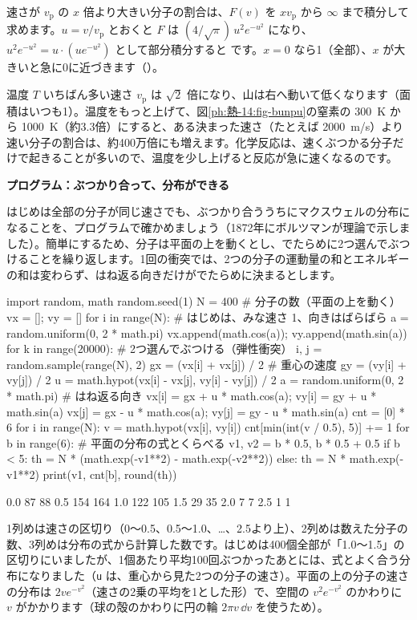 速さが $v_{\mathrm p}$ の $x$ 倍より大きい分子の割合は、$F(v)$ を $xv_{\mathrm p}$ から $\infty$ まで積分して求めます。$u=v/v_{\mathrm p}$ とおくと $F$ は $(4/\sqrt\pi)\,u^2e^{-u^2}$ になり、$u^2e^{-u^2}=u\cdot(ue^{-u^2})$ として部分積分すると
\label{ph:熱-14:erf}です。$x=0$ なら1（全部）、$x$ が大きいと急に0に近づきます（\nobreak{}\nobreak）。

\begin{phbaisuru}{温度 $T$}
いちばん多い速さ $v_{\mathrm p}$ は $\sqrt2$ 倍になり、山は右へ動いて低くなります（面積はいつも1）。温度をもっと上げて、図\ref{ph:熱-14:fig-bunpu}の窒素の \qty{300}{K} から \qty{1000}{K}（約3.3倍）にすると、ある決まった速さ（たとえば \qty{2000}{m/s}）より速い分子の割合は、約400万倍にも増えます。化学反応は、速くぶつかる分子だけで起きることが多いので、温度を少し上げると反応が急に速くなるのです。
\end{phbaisuru}

\noindent\textbf{プログラム：ぶつかり合って、分布ができる}\par\nobreak
はじめは全部の分子が同じ速さでも、ぶつかり合ううちにマクスウェルの分布になることを、プログラムで確かめましょう（1872年にボルツマンが理論で示しました）。簡単にするため、分子は平面の上を動くとし、でたらめに2つ選んでぶつけることを繰り返します。1回の衝突では、2つの分子の運動量の和とエネルギーの和は変わらず、はね返る向きだけがでたらめに決まるとします。
\begin{phcode}[Python]
import random, math
random.seed(1)
N = 400                     \# 分子の数（平面の上を動く）
vx = []; vy = []
for i in range(N):          \# はじめは、みな速さ 1、向きはばらばら
    a = random.uniform(0, 2 * math.pi)
    vx.append(math.cos(a)); vy.append(math.sin(a))
for k in range(20000):      \# 2つ選んでぶつける（弾性衝突）
    i, j = random.sample(range(N), 2)
    gx = (vx[i] + vx[j]) / 2    \# 重心の速度
    gy = (vy[i] + vy[j]) / 2
    u = math.hypot(vx[i] - vx[j], vy[i] - vy[j]) / 2
    a = random.uniform(0, 2 * math.pi)   \# はね返る向き
    vx[i] = gx + u * math.cos(a); vy[i] = gy + u * math.sin(a)
    vx[j] = gx - u * math.cos(a); vy[j] = gy - u * math.sin(a)
cnt = [0] * 6
for i in range(N):
    v = math.hypot(vx[i], vy[i])
    cnt[min(int(v / 0.5), 5)] += 1
for b in range(6):          \# 平面の分布の式とくらべる
    v1, v2 = b * 0.5, b * 0.5 + 0.5
    if b < 5:
        th = N * (math.exp(-v1**2) - math.exp(-v2**2))
    else:
        th = N * math.exp(-v1**2)
    print(v1, cnt[b], round(th))
\end{phcode}
\begin{phcodeout}
0.0 87 88
0.5 154 164
1.0 122 105
1.5 29 35
2.0 7 7
2.5 1 1
\end{phcodeout}
1列めは速さの区切り（0〜0.5、0.5〜1.0、…、2.5より上）、2列めは数えた分子の数、3列めは分布の式から計算した数です。はじめは400個全部が「1.0〜1.5」の区切りにいましたが、1個あたり平均100回ぶつかったあとには、式とよく合う分布になりました（\texttt{u} は、重心から見た2つの分子の速さ）。平面の上の分子の速さの分布は $2ve^{-v^2}$（速さの2乗の平均を1とした形）で、空間の $v^2e^{-v^2}$ のかわりに $v$ がかかります（球の殻のかわりに円の輪 $2\pi v\,\dd v$ を使うため）。

